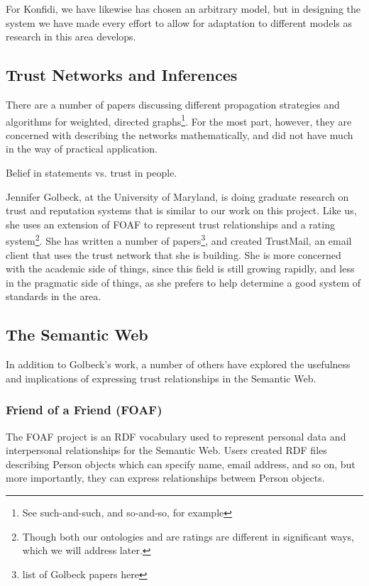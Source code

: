 \documentclass[onecolumn]{acm_proc_article-sp}
\begin{document}
For Konfidi, we have likewise has chosen an arbitrary model, but in designing the system we have made every effort to allow for adaptation to different models as research in this area develops. 

\subsection{Trust Networks and Inferences}
There are a number of papers discussing different propagation strategies and algorithms for weighted, directed graphs\footnote{See such-and-such, and so-and-so, for example}.  For the most part, however, they are concerned with describing the networks mathematically, and did not have much in the way of practical application. 

Belief in statements vs. trust in people.

Jennifer Golbeck, at the University of Maryland, is doing graduate research on trust and reputation systems\cite{golbeckSite} that is similar to our work on this project.  Like us, she uses an extension of FOAF to represent trust relationships and a rating system\footnote{Though both our ontologies and are ratings are different in significant ways, which we will address later.}.  She has written a number of papers\footnote{list of Golbeck papers here}, and created TrustMail\cite{trustMail}, an email client that uses the trust network that she is building.  She is more concerned with the academic side of things, since this field is still growing rapidly, and less in the pragmatic side of things, as she prefers to help determine a good system of standards in the area.

\subsection{The Semantic Web}
In addition to Golbeck's work, a number of others have explored the usefulness and implications of expressing trust relationships in the Semantic Web.

\subsubsection{Friend of a Friend (FOAF)}
The FOAF project\cite{foafProject} is an RDF vocabulary used to represent personal data and interpersonal relationships for the Semantic Web.  Users created RDF files describing Person objects which can specify name, email address, and so on, but more importantly, they can express relationships between Person objects.  
\end{document}

